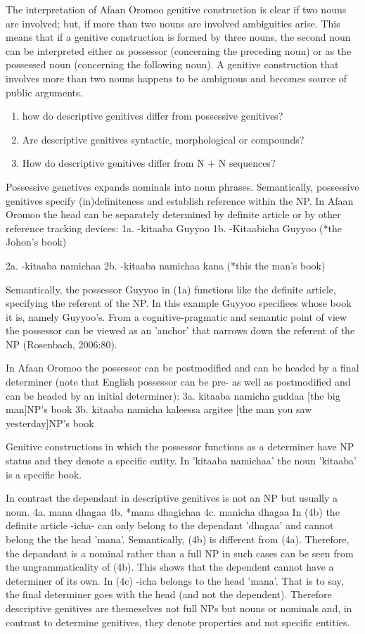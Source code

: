 \documentclass[11pt,a4paper]{article}
\begin{document}
	The interpretation of Afaan Oromoo genitive construction is clear if two nouns are involved; but, if more than two nouns are involved ambiguities arise. This means that if a genitive construction is 
	formed by three nouns, the second noun can be interpreted either as possessor (concerning the preceding noun) or as the possessed noun (concerning the
	following noun). A genitive construction that involves more than two nouns happens to be ambiguous and becomes source of public arguments.
	
	\begin{enumerate}
		\item how do descriptive genitives differ from possessive genitives?
		\item Are descriptive genitives syntactic, morphological or compounds?
		\item How do descriptive genitives differ from N + N sequences?
	\end{enumerate}
	
	Possessive genetives expands nominals into noun phrases. Semantically, possessive genitives specify (in)definiteness and establish
	reference within the NP. 
	In Afaan Oromoo the head can be separately determined by definite article or by other reference tracking devices:
	1a. -kitaaba Guyyoo
	1b. -Kitaabicha Guyyoo  (*the Johon's book)
	
	2a. -kitaaba namichaa 
	2b. -kitaaba namichaa kana (*this the man's book)
	
	Semantically, the possessor Guyyoo in (1a) functions like the definite article, specifying the referent of the NP. 
	In this example Guyyoo specifiees whose book it is, namely Guyyoo's. From a cognitive-pragmatic and semantic point of view
	the possessor can be viewed as an 'anchor' that narrows down the referent of the NP (Rosenbach, 2006:80). 
	
	In Afaan Oromoo the possessor can be postmodified and can be headed by a final determiner (note that English possessor can be pre- as well as 
	postmodified 
	and can be headed by an initial determiner):
	3a. kitaaba namicha guddaa [the big man]NP's book
	3b. kitaaba namicha kaleessa argitee [the man you saw yesterday]NP's book
	
	Genitive constructions in which the possessor functions as a determiner have NP status and they denote a specific
	entity. In 'kitaaba namichaa' the noun 'kitaaba' is a specific book. 
	
	In contrast the dependant in descriptive genitives is not an NP but usually a noun. 
	4a. mana dhagaa
	4b. *mana dhagichaa
	4c. manicha dhagaa
	In (4b) the definite article -icha- can only belong to the dependant 'dhagaa' and cannot belong the the head 'mana'. Semantically, (4b) is different 
	from (4a). 
	Therefore, the depandant is a nominal rather than a full NP in such cases can be seen from the ungrammaticality of 
	(4b). This shows that the dependent cannot have a determiner of its own. In (4c) -icha belongs to the head 'mana'. That is to say, the final determiner 
	goes with the head (and not
	the dependent). Therefore descriptive genitives are themeselves not full NPs but nouns or nominals and, in contrast to
	determine genitives, they denote properties and not specific entities. 
	
\end{document}
